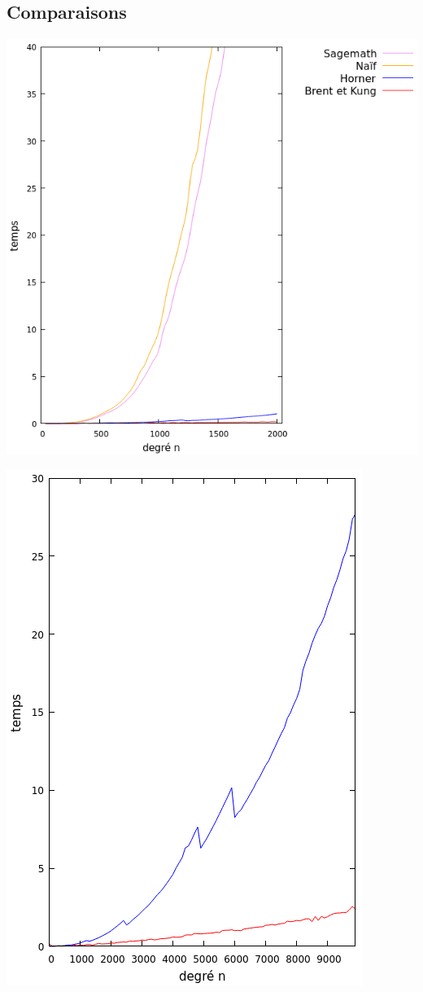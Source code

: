 \documentclass[a4paper]{article}
\begin{document}
\subsection{Comparaisons}
\begin{multicols}{2}
    \includegraphics[scale=0.4, center]{comp.png}
    \columnbreak

    \includegraphics[scale=0.4, center]{comp_2.png}
\end{multicols}
\end{document}
